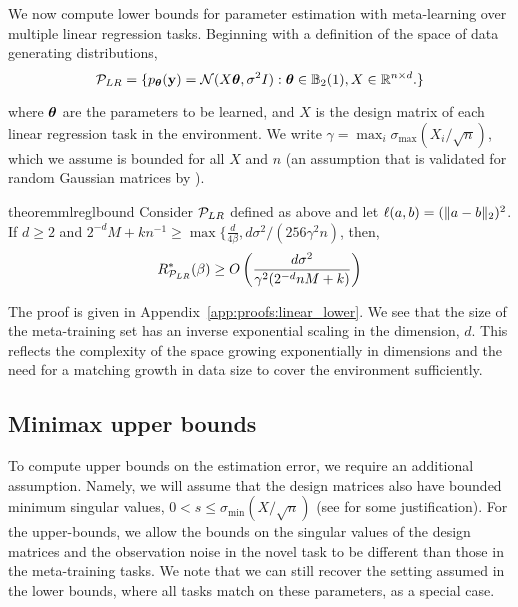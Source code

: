 We now compute lower bounds for parameter estimation with meta-learning over multiple linear regression tasks.
Beginning with a definition of the space of data generating distributions,
\[\mathcal{P}_{LR} = \{ p_{\bm{\theta}}(\mathbf{y}) = \mathcal{N}(X\bm{\theta}, \sigma^2 I): \bm{\theta} \in \mathbb{B}_2(1), X \in \mathbb{R}^{n \times d}. \} \]

where $\bm{\theta}$ are the parameters to be learned, and $X$ is the design matrix of each linear regression task in the environment.
We write $\gamma = \max_{i} \sigma_{\max}(X_i/\sqrt{n})$, which we assume is bounded for all $X$ and $n$ (an assumption that is validated for random Gaussian matrices by \citet{raskutti2011minimax}).

\begin{restatable}{theorem}{mlreglbound}\label{thm:mlreg_lower_bound}
Consider $\mathcal{P}_{LR}$ defined as above and let $\ell(a,b) = (\lVert a-b \rVert_2)^2$. If $d \geq 2$ and $2^{-d}M + kn^{-1} \geq \max\{\frac{d}{4\beta}, d\sigma^2/(256\gamma^2 n)$, then,
\[R^*_{\mathcal{P}_{LR}}(\beta) \geq O\left(\frac{d\sigma^2}{\gamma^2 (2^{-d}{n} M + {k})}\right) \]
\end{restatable}

The proof is given in Appendix~\ref{app:proofs:linear_lower}. We see that the size of the meta-training set has an inverse exponential scaling in the dimension, $d$. This reflects the complexity of the space growing exponentially in dimensions and the need for a matching growth in data size to cover the environment sufficiently.

\subsection{Minimax upper bounds}

To compute upper bounds on the estimation error, we require an additional assumption. Namely, we will assume that the design matrices also have bounded minimum singular values, $0 < s \leq \sigma_{\min}(X/\sqrt{n})$ (see \citet{raskutti2011minimax} for some justification). For the upper-bounds, we allow the bounds on the singular values of the design matrices and the observation noise in the novel task to be different than those in the meta-training tasks. We note that we can still recover the setting assumed in the lower bounds, where all tasks match on these parameters, as a special case.


